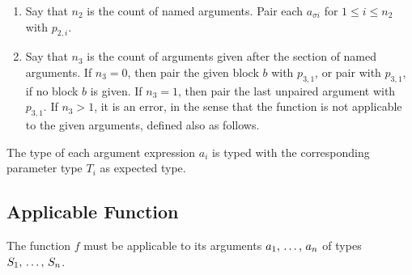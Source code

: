 \begin{enumerate}
\item Say that $n_2$ is the count of named arguments. Pair each $a_{\sigma i}$ for $1 \leq i \leq n_2$ with $p_{2,i}$. 

\item Say that $n_3$ is the count of arguments given after the section of named arguments. If $n_3 = 0$, then pair the given block $b$ with $p_{3,1}$, or pair  with $p_{3,1}$, if no block $b$ is given. If $n_3 = 1$, then pair the last unpaired argument with $p_{3,1}$. If $n_3 > 1$, it is an error, in the sense that the function is not applicable to the given arguments, defined also as follows. 
\end{enumerate}

The type of each argument expression $a_i$ is typed with the corresponding parameter type $T_i$ as expected type. 






\subsection{Applicable Function}

The function $f$ must be applicable to its arguments $a_1 ,\, \ldots ,\, a_n$ of types $S_1 ,\, \ldots ,\, S_n$. 

